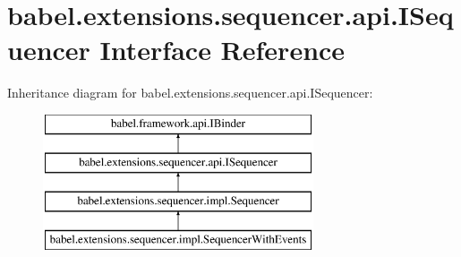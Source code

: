 \hypertarget{interfacebabel_1_1extensions_1_1sequencer_1_1api_1_1_i_sequencer}{\section{babel.\-extensions.\-sequencer.\-api.\-I\-Sequencer Interface Reference}
\label{interfacebabel_1_1extensions_1_1sequencer_1_1api_1_1_i_sequencer}
}
Inheritance diagram for babel.\-extensions.\-sequencer.\-api.\-I\-Sequencer\-:\begin{figure}[H]
\begin{center}
\leavevmode
\includegraphics[height=4.000000cm]{interfacebabel_1_1extensions_1_1sequencer_1_1api_1_1_i_sequencer}
\end{center}
\end{figure}
